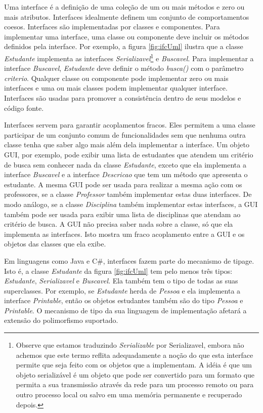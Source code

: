 \documentclass[
	article,			%
	12pt,				%
	openright,
	twoside,			%
	a4paper,			%
	english,			%
	french,
	brazil,				%
	sumario=tradicional
	]{abntex2}
\begin{document}
Uma interface é a definição de uma coleção de um ou mais métodos e zero ou mais atributos. Interfaces idealmente definem um conjunto de comportamentos coesos. Interfaces são implementadas por classes e componentes. Para implementar uma interface, uma classe ou componente deve incluir os métodos definidos pela interface. Por exemplo, a figura \ref{fig:ifcUml} ilustra que a classe \emph{Estudante} implementa as interfaces \emph{Serializavel}\footnote{Observe que estamos traduzindo \emph{Serializable} por Serializavel, embora não achemos que este termo reflita adequadamente a noção do que esta interface permite que seja feito com os objetos que a implementam. A idéia é que um objeto serializável é um objeto que pode ser convertido para um formato que permita a sua transmissão através da rede para um processo remoto ou para outro processo local ou salvo em uma memória permanente e recuperado depois.} e \emph{Buscavel}. Para implementar a interface \emph{Buscavel}, \emph{Estudante} deve definir o método \emph{busca()} com o parâmetro \emph{criterio}. Qualquer classe ou componente pode implementar zero ou mais interfaces e uma ou mais classes podem implementar qualquer interface. Interfaces são usadas para promover a consistência dentro de seus modelos e código fonte.

Interfaces servem para garantir acoplamentos fracos. Eles permitem a uma classe participar de um conjunto comum de funcionalidades sem que nenhuma outra classe tenha que saber algo mais além dela implementar a interface. Um objeto GUI, por exemplo, pode exibir uma lista de estudantes que atendem um critério de busca sem conhecer nada da classe \emph{Estudante}, exceto que ela implementa a interface \emph{Buscavel} e a interface \emph{Descricao} que tem um método que apresenta o estudante. A mesma GUI pode ser usada para realizar a mesma ação com os professores, se a classe \emph{Professor} também implementar estas duas interfaces. De modo análogo, se a classe \emph{Disciplina} também implementar estas interfaces, a GUI também pode ser usada para exibir uma lista de disciplinas que atendam ao critério de busca. A GUI não precisa saber nada sobre a classe, só que ela implementa as interfaces. Isto mostra um fraco acoplamento entre a GUI e os objetos das classes que ela exibe.

Em linguagens como Java e C\#, interfaces fazem parte do mecanismo de tipage. Isto é, a classe \emph{Estudante} da figura \ref{fig:ifcUml} tem pelo menos três tipos: \emph{Estudante}, \emph{Serializavel} e \emph{Buscavel}. Ela também tem o tipo de todas as suas superclasses. Por exemplo, se \emph{Estudante} herda de \emph{Pessoa} e ela implementa a interface \emph{Printable}, então os objetos estudantes também são do tipo \emph{Pessoa} e \emph{Printable}. O mecanismo de tipo da sua linguagem de implementação afetará a extensão do polimorfismo suportado.
\end{document}
